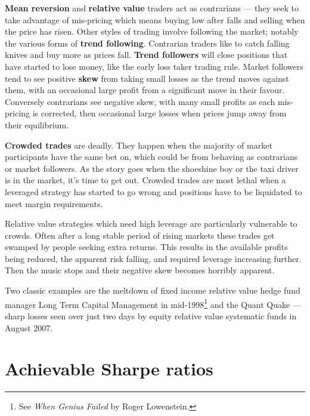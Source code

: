 \textbf{Mean reversion} and \textbf{relative value} traders act as contrarians --- they seek to take advantage of mis-pricing which means buying low after falls and selling when the price has risen. Other styles of trading involve following the market; notably the various forms of \textbf{trend following}. Contrarian traders like to catch falling knives and buy more as prices fall. \textbf{Trend followers} will close positions that have started to lose money, like the early loss taker trading rule. Market followers tend to see positive \textbf{skew} from taking small losses as the trend moves against them, with an occasional large profit from a significant move in their favour. Conversely contrarians see negative skew, with many small profits as each mis-pricing is corrected, then occasional large losses when prices jump away from their equilibrium.

\textbf{Crowded trades} are deadly. They happen when the majority of market participants have the same bet on, which could be from behaving as contrarians or market followers. As the story goes when the shoeshine boy or the taxi driver is in the market, it's time to get out. Crowded trades are most lethal when a leveraged strategy has started to go wrong and positions have to be liquidated to meet margin requirements.

Relative value strategies which need high leverage are particularly vulnerable to crowds. Often after a long stable period of rising markets these trades get swamped by people seeking extra returns. This results in the available profits being reduced, the apparent risk falling, and required leverage increasing further. Then the music stops and their negative skew becomes horribly apparent.

Two classic examples are the meltdown of fixed income relative value hedge fund manager Long Term Capital Management in mid-1998\footnote{See \textit{When Genius Failed} by Roger Lowenstein.} and the Quant Quake --- sharp losses seen over just two days by equity relative value systematic funds in August 2007.

\section*{Achievable Sharpe ratios}  {}


